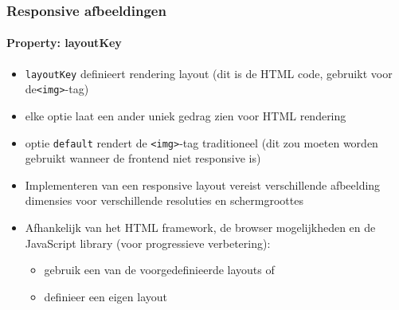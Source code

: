 \begin{frame}[fragile]
	\frametitle{Responsive afbeeldingen}
	\framesubtitle{Property: layoutKey}

	\begin{itemize}
		\item \texttt{layoutKey} definieert rendering layout\newline
			(dit is de HTML code, gebruikt voor de\texttt{<img>}-tag)
		\item elke optie laat een ander uniek gedrag zien voor HTML rendering
		\item optie \texttt{default} rendert de \texttt{<img>}-tag traditioneel\newline
			(dit zou moeten worden gebruikt wanneer de frontend niet responsive is)
		\item Implementeren van een responsive layout vereist verschillende afbeelding dimensies voor verschillende resoluties en schermgroottes
		\item Afhankelijk van het HTML framework, de browser mogelijkheden en de JavaScript library (voor progressieve verbetering):

			\begin{itemize}
				\item gebruik een van de voorgedefinieerde layouts of
				\item definieer een eigen layout
			\end{itemize}

	\end{itemize}

\end{frame}


